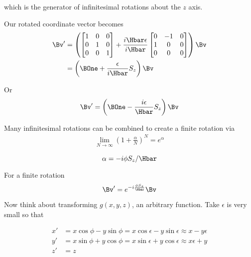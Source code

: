 which is the generator of infinitesimal rotations about the \(z\) axis.

Our rotated coordinate vector becomes
\begin{equation}\label{eqn:lecture12rotationsAndAngularMomentum:260}
\begin{aligned}
\Bv' &=
\left(
\begin{bmatrix}
1 & 0 & 0 \\
0 & 1 & 0 \\
0 & 0 & 1
\end{bmatrix}
+
\frac{i \Hbar \epsilon}{i\Hbar}
\begin{bmatrix}
0 &- 1 & 0 \\
1 & 0 & 0 \\
0 & 0 & 0
\end{bmatrix}
\right)
\Bv \\
&=
\left(
\BOne + \frac{\epsilon}{i \Hbar} S_z
\right)
\Bv
\end{aligned}
\end{equation}

Or
\begin{equation}\label{eqn:PHY356FDec7:70}
\begin{aligned}
\Bv'
=
\left(
\BOne - \frac{i \epsilon}{\Hbar} S_z
\right)
\Bv
\end{aligned}
\end{equation}

Many infinitesimal rotations can be combined to create a finite rotation via
\begin{equation}\label{eqn:PHY356FDec7:80}
\begin{aligned}
\lim_{N \rightarrow \infty} \left( 1 + \frac{\alpha}{N} \right)^N = e^\alpha
\end{aligned}
\end{equation}

\begin{equation}\label{eqn:PHY356FDec7:85}
\alpha = -i \phi S_z/\Hbar
\end{equation}

For a finite rotation
\begin{equation}\label{eqn:PHY356FDec7:90}
\Bv'
=
e^{ -i \frac{\phi S_z}{\Hbar} }
\Bv
\end{equation}

Now think about transforming \(g(x,y,z)\), an arbitrary function.  Take \(\epsilon\) is very small so that

\begin{equation}\label{eqn:PHY356FDec7:100}
\begin{aligned}
x' &= x \cos \phi - y \sin\phi = x \cos \epsilon - y \sin\epsilon \approx x - y \epsilon \\
y' &= x \sin \phi + y \cos\phi = x \sin \epsilon + y \cos\epsilon \approx x \epsilon + y \\
z' &= z
\end{aligned}
\end{equation}


